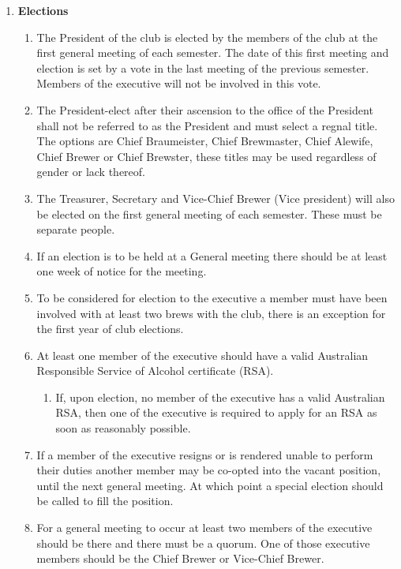\documentclass{article}
\begin{document}
\begin{enumerate}[label=\textbf{\arabic*}]
    \item \textbf{Elections}
    \begin{enumerate}[label=4.\arabic*]
        \item The President of the club is elected by the members of the club at the first general meeting of each semester. The date of this first meeting and election is set by a vote in the last meeting of the previous semester. Members of the executive will not be involved in this vote.
        \item The President-elect after their ascension to the office of the President shall not be referred to as the President and must select a regnal title. The options are Chief Braumeister, Chief Brewmaster, Chief Alewife, Chief Brewer or Chief Brewster, these titles may be used regardless of gender or lack thereof.
        \item The Treasurer, Secretary and Vice-Chief Brewer (Vice president) will also be elected on the first general meeting of each semester. These must be separate people.
        \item If an election is to be held at a General meeting there should be at least one week of notice for the meeting.
        \item To be considered for election to the executive a member must have been involved with at least two brews with the club, there is an exception for the first year of club elections.
        \item At least one member of the executive should have a valid Australian Responsible Service of Alcohol certificate (RSA).
        \begin{enumerate}[label=4.6.\arabic*]
            \item If, upon election, no member of the executive has a valid Australian RSA, then one of the executive is required to apply for an RSA as soon as reasonably possible.
        \end{enumerate}
        \item If a member of the executive resigns or is rendered unable to perform their duties another member may be co-opted into the vacant position, until the next general meeting. At which point a special election should be called to fill the position.
        \item For a general meeting to occur at least two members of the executive should be there and there must be a quorum. One of those executive members should be the Chief Brewer or Vice-Chief Brewer.
        \begin{enumerate}[label=4.8.\arabic*]

\end{enumerate}
\end{enumerate}
\end{enumerate}
\end{document}
